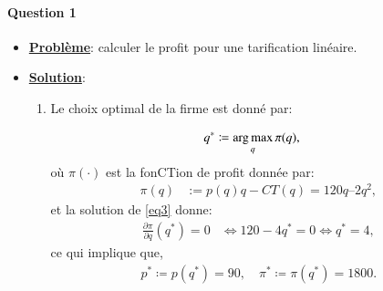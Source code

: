 \documentclass[notes, ignorenonframetext, compress, 9pt, xcolor=svgnames, aspectratio=169]{beamer}
\begin{document}
    \begin{frame}
[allowframebreaks]{\insertsection}
\framesubtitle{Question 1\\}
\begin{itemize}
\item \textbf{\underline{Problème}}: calculer le profit pour une tarification linéaire.
 
\item \textbf{\underline{Solution}}:

\begin{enumerate}[$\cdot$]
\item Le choix optimal de la firme est donné par:

\begin{align}
q^* &\coloneqq \argmax_q \pi(q),
\label{eq3}
\end{align}
où  $\pi(\cdot)$ est la fonCTion de profit donnée par:
\begin{align*}
\pi(q) &:= p(q)q - CT(q) = 120q – 2q^2,
\end{align*}
et la solution de \eqref{eq3}  donne:
\begin{align*}
\frac{\partial \pi}{\partial q}(q^*) = 0 &\Leftrightarrow 120-4q^* = 0 \Leftrightarrow q^* = 4,
\end{align*}
ce qui implique que,
\begin{align*}
p^* \coloneqq p(q^*) = 90, \quad \pi^* \coloneqq \pi(q^*) = 1800.
\end{align*}

\end{enumerate}
\end{itemize}

 \end{frame}
\end{document}
